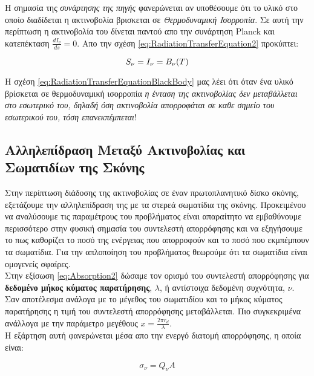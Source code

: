 Η σημασία της {\it συνάρτησης της πηγής} φανερώνεται αν υποθέσουμε ότι το υλικό στο οποίο διαδίδεται η ακτινοβολία βρισκεται σε {\it Θερμοδυναμική Ισορροπία}. Σε αυτή την περίπτωση η ακτινοβολία του δίνεται παντού απο την συνάρτηση {\en Planck} και κατεπέκταση $\frac{dI_{\nu}}{ds}=0$. Απο την σχέση \eqref{eq:RadiationTransferEquation2} προκύπτει:

\begin{equation}\label{eq:RadiationTransferEquationBlackBody}
  S_{\nu} = I_{\nu} = B_{\nu}(T)\\
\end{equation} 

Η σχέση \eqref{eq:RadiationTransferEquationBlackBody} μας λέει ότι όταν ένα υλικό βρίσκεται σε θερμοδυναμική ισορροπία {\it η ένταση της ακτινοβολίας δεν μεταβάλλεται στο εσωτερικό του, δηλαδή όση ακτινοβολία απορροφάται σε καθε σημείο του εσωτερικού του, τόση επανεκπέμπεται}!

\subsection{Αλληλεπίδραση Μεταξύ Ακτινοβολίας και Σωματιδίων της Σκόνης}

Στην περίπτωση διάδοσης της ακτινοβολίας σε έναν πρωτοπλανητικό δίσκο σκόνης, εξετάζουμε την αλληλεπίδραση της με τα στερεά σωματίδια της σκόνης. Προκειμένου να αναλύσουμε τις παραμέτρους του προβλήματος είναι απαραίτητο να εμβαθύνουμε περισσότερο στην φυσική σημασία του συντελεστή απορρόφησης και να εξηγήσουμε το πως καθορίζει το ποσό της ενέργειας που απορροφούν και το ποσό που εκμπέμπουν τα σωματίδια. Για την απλοποίηση του προβλήματος θεωρούμε ότι τα σωματίδια είναι ομογενείς σφαίρες.\\ 

Στην εξίσωση \eqref{eq:Absorption2} δώσαμε τον ορισμό του συντελεστή απορρόφησης για {\bf δεδομένο μήκος κύματος παρατήρησης}, $\lambda$, ή αντίστοιχα δεδομένη συχνότητα, $\nu$. Σαν αποτέλεσμα ανάλογα με το μέγεθος του σωματιδίου και το μήκος κύματος παρατήρησης η τιμή του συντελεστή απορρόφησης μεταβάλλεται. Πιο συγκεκριμένα ανάλλογα με την παράμετρο μεγέθους $x=\frac{2 \pi r_{d}}{\lambda}$.\\

Η εξάρτηση αυτή φανερώνεται μέσα απο την ενεργό διατομή απορρόφησης, η οποία είναι:

\begin{equation}\label{eq:CrossSection}
 \sigma_{\nu} = Q_{\nu} Α
\end{equation}

